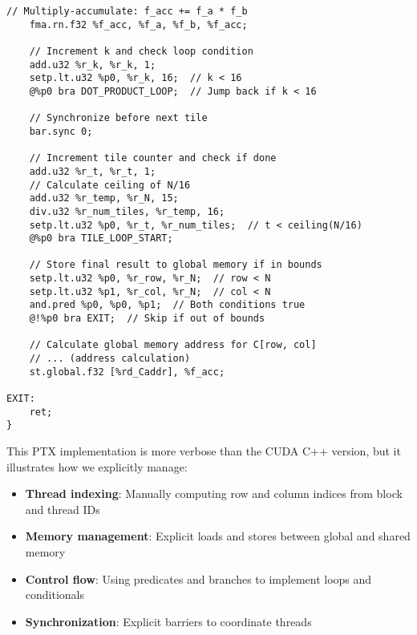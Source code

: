 \begin{lstlisting}[style=ptx]
    // Multiply-accumulate: f_acc += f_a * f_b
    fma.rn.f32 %f_acc, %f_a, %f_b, %f_acc;
    
    // Increment k and check loop condition
    add.u32 %r_k, %r_k, 1;
    setp.lt.u32 %p0, %r_k, 16;  // k < 16
    @%p0 bra DOT_PRODUCT_LOOP;  // Jump back if k < 16
    
    // Synchronize before next tile
    bar.sync 0;
    
    // Increment tile counter and check if done
    add.u32 %r_t, %r_t, 1;
    // Calculate ceiling of N/16
    add.u32 %r_temp, %r_N, 15;
    div.u32 %r_num_tiles, %r_temp, 16;
    setp.lt.u32 %p0, %r_t, %r_num_tiles;  // t < ceiling(N/16)
    @%p0 bra TILE_LOOP_START;
    
    // Store final result to global memory if in bounds
    setp.lt.u32 %p0, %r_row, %r_N;  // row < N
    setp.lt.u32 %p1, %r_col, %r_N;  // col < N
    and.pred %p0, %p0, %p1;  // Both conditions true
    @!%p0 bra EXIT;  // Skip if out of bounds
    
    // Calculate global memory address for C[row, col]
    // ... (address calculation)
    st.global.f32 [%rd_Caddr], %f_acc;
    
EXIT:
    ret;
}
\end{lstlisting}

This PTX implementation is more verbose than the CUDA C++ version, but it illustrates how we explicitly manage:

\begin{itemize}
    \item \textbf{Thread indexing}: Manually computing row and column indices from block and thread IDs
    \item \textbf{Memory management}: Explicit loads and stores between global and shared memory
    \item \textbf{Control flow}: Using predicates and branches to implement loops and conditionals
    \item \textbf{Synchronization}: Explicit barriers to coordinate threads
\end{itemize}


